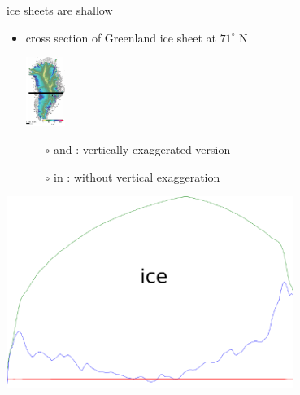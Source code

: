 \documentclass[10pt,hyperref={pdfpagelabels=true}]{beamer}
\begin{document}
\begin{frame}{ice sheets are shallow}

\begin{itemize}
\item cross section of Greenland ice sheet at $71^\circ$ N

\vspace{-5mm} \hfill \includegraphics[width=0.1\textwidth]{cutgreenland}

\vspace{-15mm}
  \begin{itemize}
  \item[$\circ$] {\color{dark green}{green}} and {\color{dark blue}{blue}}: vertically-exaggerated version
  \item[$\circ$] in {\color{dark red}{red}}: without vertical exaggeration
  \end{itemize}
\end{itemize}
\normalsize

  \begin{center}
      \quad \includegraphics[width=0.7\textwidth]{greentransecttrimmed}
    
    \bigskip
    \qquad\qquad\qquad {}
  \end{center}
\end{frame}
\end{document}
